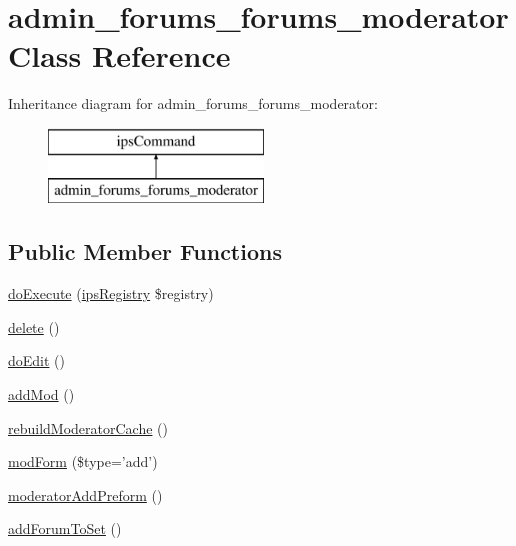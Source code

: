 \hypertarget{classadmin__forums__forums__moderator}{\section{admin\-\_\-forums\-\_\-forums\-\_\-moderator Class Reference}
\label{classadmin__forums__forums__moderator}
}
Inheritance diagram for admin\-\_\-forums\-\_\-forums\-\_\-moderator\-:\begin{figure}[H]
\begin{center}
\leavevmode
\includegraphics[height=2.000000cm]{classadmin__forums__forums__moderator}
\end{center}
\end{figure}
\subsection*{Public Member Functions}
\begin{DoxyCompactItemize}
\item 
\hyperlink{classadmin__forums__forums__moderator_afbc4e912a0604b94d47d66744c64d8ba}{do\-Execute} (\hyperlink{classips_registry}{ips\-Registry} \$registry)
\item 
\hyperlink{classadmin__forums__forums__moderator_a13bdffdd926f26b825ea57066334ff01}{delete} ()
\item 
\hyperlink{classadmin__forums__forums__moderator_a30147914e6321f54c83f8e1e8cdae6b7}{do\-Edit} ()
\item 
\hyperlink{classadmin__forums__forums__moderator_aca36e7bde1d9236ac59abfdf1ce7c9e4}{add\-Mod} ()
\item 
\hyperlink{classadmin__forums__forums__moderator_a71e0bf32af13c1e1492b932f46964226}{rebuild\-Moderator\-Cache} ()
\item 
\hyperlink{classadmin__forums__forums__moderator_aea079e44a57a8020f1c125ded1f6916c}{mod\-Form} (\$type='add')
\item 
\hyperlink{classadmin__forums__forums__moderator_a2fdd2bacec8daf4b80d3fb2b59296063}{moderator\-Add\-Preform} ()
\item 
\hyperlink{classadmin__forums__forums__moderator_a7b849e5ed35bc59585d70a1169316d70}{add\-Forum\-To\-Set} ()
\end{DoxyCompactItemize}
